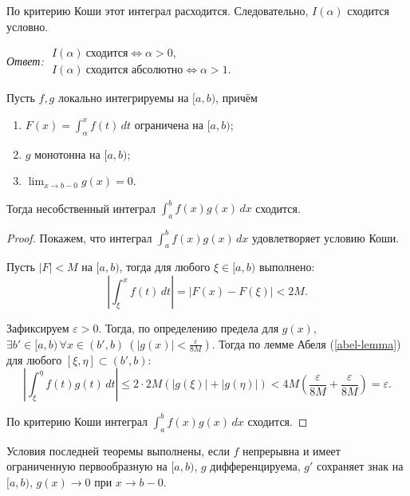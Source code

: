 \begin{example}
\begin{solution}
\begin{itemize}
                По критерию Коши этот интеграл расходится. Следовательно, $I(\alpha)$ сходится условно.
        \end{itemize}

        \emph{Ответ:} $\begin{array}{l} I(\alpha)\ \text{сходится} \Leftrightarrow \alpha > 0, \\ I(\alpha) \ \text{сходится абсолютно} \Leftrightarrow \alpha > 1.\end{array}$
    \end{solution}
\end{example}

\begin{theorem}
    \label{dirichlet-criterion}

    Пусть $f, g$ локально интегрируемы на $[a, b)$, причём
    \begin{enumerate}
        \item $F(x) = \int_\alpha^x f(t)\, dt$ ограничена на $[a, b)$;
        \item $g$ монотонна на $[a, b)$;
        \item $\displaystyle \lim_{x \rightarrow b - 0} g(x) = 0$.
    \end{enumerate}

    Тогда несобственный интеграл $\int_a^b f(x)g(x)\, dx$ сходится.

    \begin{proof}
        Покажем, что интеграл $\int_a^b f(x)g(x)\, dx$ удовлетворяет условию Коши.

        Пусть $|F| < M$ на $[a, b)$, тогда для любого $\xi \in [a, b)$ выполнено:
        \[
            \left|\int_\xi^x f(t)\, dt\right| = \left|F(x) - F(\xi)\right| < 2M.
        \]

        Зафиксируем $\varepsilon > 0$. Тогда, по определению предела для $g(x)$, $\exists b' \in [a, b) \, \forall x \in (b', b) \ \left(|g(x)| < \frac{\varepsilon}{8M}\right)$. Тогда по лемме Абеля (\ref{abel-lemma}) для любого $[\xi, \eta] \subset (b', b)$:
        \[
            \left|\int_\xi^\eta f(t)g(t)\, dt \right| \le 2 \cdot 2M\left(|g(\xi)| + |g(\eta)|\right) < 4M\left(\frac{\varepsilon}{8M} + \frac{\varepsilon}{8M}\right) = \varepsilon.
        \]

        По критерию Коши интеграл $\int_a^b f(x)g(x)\, dx$ сходится.
    \end{proof}

    \begin{note}
        Условия последней теоремы выполнены, если $f$ непрерывна и имеет ограниченную первообразную на $[a, b)$, $g$ дифференцируема, $g'$ сохраняет знак на $[a, b)$, $g(x) \to 0$ при $x \rightarrow b - 0$.
    \end{note}
\end{theorem}

